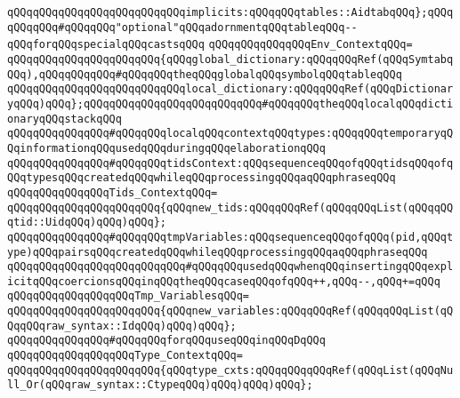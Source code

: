 \verb|qQQqqQQqqQQqqQQqqQQqqQQqqQQqimplicits:qQQqqQQqtables::AidtabqQQq};qQQqqQQqqQQq#qQQqqQQq"optional"qQQqadornmentqQQqtableqQQq--qQQqforqQQqspecialqQQqcastsqQQq|\newline
\newline
\verb|qQQqqQQqqQQqqQQqEnv_ContextqQQq=|\newline
\verb|qQQqqQQqqQQqqQQqqQQqqQQq{qQQqglobal_dictionary:qQQqqQQqRef(qQQqSymtabqQQq),qQQqqQQqqQQq#qQQqqQQqtheqQQqglobalqQQqsymbolqQQqtableqQQq|\newline
\verb|qQQqqQQqqQQqqQQqqQQqqQQqqQQqlocal_dictionary:qQQqqQQqRef(qQQqDictionaryqQQq)qQQq};qQQqqQQqqQQqqQQqqQQqqQQqqQQq#qQQqqQQqtheqQQqlocalqQQqdictionaryqQQqstackqQQq|\newline
\newline
\newline
\verb|qQQqqQQqqQQqqQQq#qQQqqQQqlocalqQQqcontextqQQqtypes:qQQqqQQqtemporaryqQQqinformationqQQqusedqQQqduringqQQqelaborationqQQq|\newline
\newline
\verb|qQQqqQQqqQQqqQQq#qQQqqQQqtidsContext:qQQqsequenceqQQqofqQQqtidsqQQqofqQQqtypesqQQqcreatedqQQqwhileqQQqprocessingqQQqaqQQqphraseqQQq|\newline
\verb|qQQqqQQqqQQqqQQqTids_ContextqQQq=|\newline
\verb|qQQqqQQqqQQqqQQqqQQqqQQq{qQQqnew_tids:qQQqqQQqRef(qQQqqQQqList(qQQqqQQqtid::UidqQQq)qQQq)qQQq};|\newline
\newline
\verb|qQQqqQQqqQQqqQQq#qQQqqQQqtmpVariables:qQQqsequenceqQQqofqQQq(pid,qQQqtype)qQQqpairsqQQqcreatedqQQqwhileqQQqprocessingqQQqaqQQqphraseqQQq|\newline
\verb|qQQqqQQqqQQqqQQqqQQqqQQqqQQq#qQQqqQQqusedqQQqwhenqQQqinsertingqQQqexplicitqQQqcoercionsqQQqinqQQqtheqQQqcaseqQQqofqQQq++,qQQq--,qQQq+=qQQq|\newline
\verb|qQQqqQQqqQQqqQQqqQQqTmp_VariablesqQQq=|\newline
\verb|qQQqqQQqqQQqqQQqqQQqqQQq{qQQqnew_variables:qQQqqQQqRef(qQQqqQQqList(qQQqqQQqraw_syntax::IdqQQq)qQQq)qQQq};|\newline
\newline
\verb|qQQqqQQqqQQqqQQq#qQQqqQQqforqQQquseqQQqinqQQqDqQQq|\newline
\verb|qQQqqQQqqQQqqQQqqQQqType_ContextqQQq=|\newline
\verb|qQQqqQQqqQQqqQQqqQQqqQQq{qQQqtype_cxts:qQQqqQQqqQQqRef(qQQqList(qQQqNull_Or(qQQqraw_syntax::CtypeqQQq)qQQq)qQQq)qQQq};|\newline
